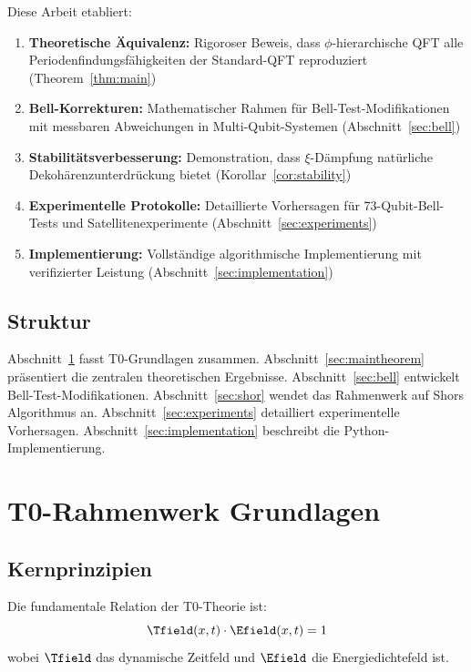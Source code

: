 Diese Arbeit etabliert:

\begin{enumerate}
	\item \textbf{Theoretische Äquivalenz:} Rigoroser Beweis, dass $\phi$-hierarchische QFT alle Periodenfindungsfähigkeiten der Standard-QFT reproduziert (Theorem~\ref{thm:main})
	\item \textbf{Bell-Korrekturen:} Mathematischer Rahmen für Bell-Test-Modifikationen mit messbaren Abweichungen in Multi-Qubit-Systemen (Abschnitt~\ref{sec:bell})
	\item \textbf{Stabilitätsverbesserung:} Demonstration, dass $\xi$-Dämpfung natürliche Dekohärenzunterdrückung bietet (Korollar~\ref{cor:stability})
	\item \textbf{Experimentelle Protokolle:} Detaillierte Vorhersagen für 73-Qubit-Bell-Tests und Satellitenexperimente (Abschnitt~\ref{sec:experiments})
	\item \textbf{Implementierung:} Vollständige algorithmische Implementierung mit verifizierter Leistung (Abschnitt~\ref{sec:implementation})
\end{enumerate}

\subsection{Struktur}

Abschnitt~\ref{sec:t0framework} fasst T0-Grundlagen zusammen. Abschnitt~\ref{sec:maintheorem} präsentiert die zentralen theoretischen Ergebnisse. Abschnitt~\ref{sec:bell} entwickelt Bell-Test-Modifikationen. Abschnitt~\ref{sec:shor} wendet das Rahmenwerk auf Shors Algorithmus an. Abschnitt~\ref{sec:experiments} detailliert experimentelle Vorhersagen. Abschnitt~\ref{sec:implementation} beschreibt die Python-Implementierung.

\section{T0-Rahmenwerk Grundlagen}
\label{sec:t0framework}

\subsection{Kernprinzipien}

\begin{definition}
	Die fundamentale Relation der T0-Theorie ist:
	\begin{equation}
		\Tfield(x,t) \cdot \Efield(x,t) = 1
		\label{eq:t0duality}
	\end{equation}
	wobei $\Tfield$ das dynamische Zeitfeld und $\Efield$ die Energiedichtefeld ist.
\end{definition}

